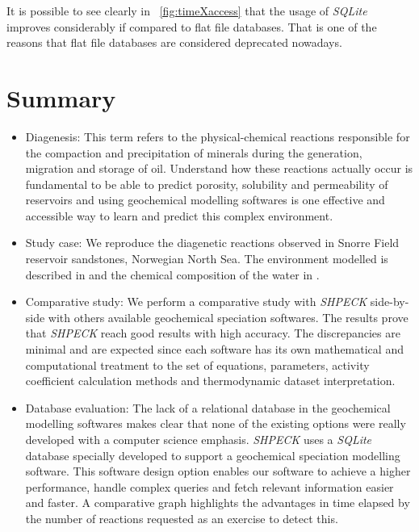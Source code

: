 It is possible to see clearly in ~\ref{fig:timeXaccess} that the usage of \emph{SQLite} improves considerably if compared to flat file databases. That is one of the reasons that flat file databases are considered deprecated nowadays. 

\newpage

\section{Summary}
\begin{itemize}
    \item Diagenesis: This term refers to the physical-chemical reactions responsible for the compaction and precipitation of minerals during the generation, migration and storage of oil. Understand how these reactions actually occur is fundamental to be able to predict porosity, solubility and permeability of reservoirs and using geochemical modelling softwares is one effective and accessible way to learn and predict this complex environment.
    \item Study case: We reproduce the diagenetic reactions observed in Snorre Field reservoir sandstones, Norwegian North Sea. 
    The environment modelled is described in \cite{Morad:90} and the chemical composition of the water in \cite{Nordstrom:79}.
    \item Comparative study: We perform a comparative study with \emph{SHPECK} side-by-side with others available geochemical speciation softwares. The results prove that \emph{SHPECK} reach good results with high accuracy. The discrepancies are minimal and are expected since each software has its own mathematical and computational treatment to the set of equations, parameters, activity coefficient calculation methods and thermodynamic dataset interpretation. 
    \item Database evaluation: The lack of a relational database in the geochemical modelling softwares makes clear that none of the existing options were really developed with a computer science emphasis. \emph{SHPECK} uses a \emph{SQLite} database specially developed to support a geochemical speciation modelling software. This software design option enables our software to achieve a higher performance, handle complex queries and fetch relevant information easier and faster. A comparative graph highlights the advantages in time elapsed by the number of reactions requested as an exercise to detect this.
\end{itemize}